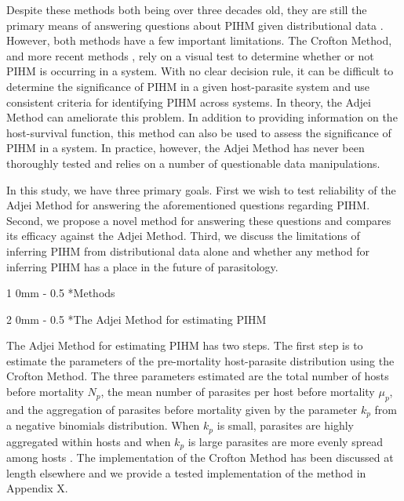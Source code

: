 \documentclass[12pt, a4paper]{article}
\makeatletter
\renewcommand{\section}{\@startsection
{section}%
{1}%
{0mm}%
{-\baselineskip}%
{0.5\baselineskip}%
{\normalfont\bf\large}} %
\renewcommand{\subsection}{\@startsection
{subsection}%
{2}%
{0mm}%
{-\baselineskip}%
{0.5\baselineskip}%
{\normalfont\bf}} %
\makeatother
\begin{document}
Despite these methods both being over three decades old, they are still the
primary means of answering questions about PIHM given distributional data
\citep[but see][for an alternative to the Crofton
Method]{Ferguson2011}. However, both methods have a few important limitations.
The Crofton Method, and more recent methods \citep{Ferguson2011},
rely on a visual test to determine whether or not PIHM is occurring in a
system.  With no clear decision rule, it can be difficult to determine the
significance of PIHM in a given host-parasite system and use consistent criteria for identifying PIHM across systems. In theory, the Adjei Method can ameliorate this problem. In addition to providing information on the host-survival function, this method can also be used to assess the significance of
PIHM in a system.
In practice, however, the Adjei Method has never been thoroughly tested and
relies on a number of questionable data manipulations.

In this study, we have
three primary goals. First we wish to test reliability of the Adjei Method for
answering the aforementioned questions regarding PIHM.  Second, we propose a
novel method for answering these questions and compares its efficacy against the Adjei Method.  Third, we
discuss the limitations of inferring PIHM from distributional data alone and
whether any method for inferring PIHM has a place in the future of
parasitology.

\section*{Methods}

\subsection*{The Adjei Method for estimating PIHM}

The Adjei Method for estimating PIHM has two steps.  The first
step is to estimate the parameters of the pre-mortality host-parasite
distribution using the Crofton Method.  The three parameters estimated are the
total number of hosts before mortality $N_p$,  the mean number of parasites per
host before mortality $\mu_p$, and the aggregation of parasites before
mortality given by the parameter $k_p$ from a negative binomials distribution.
When $k_p$ is small, parasites are highly aggregated within hosts and when
$k_p$ is large parasites are more evenly spread among hosts \citep{Wilson2002}.  The implementation of the Crofton Method has been discussed at length elsewhere \citep[e.g.][]{Royce1990,Lester1984} and we provide a tested implementation of the method in Appendix X.
\end{document}
